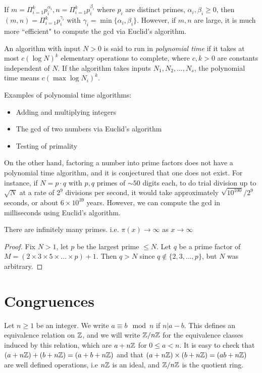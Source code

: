 \documentclass[10pt,a4paper]{article}
\begin{document}
If $m = \Pi_{i=1}^k p_i^{\alpha_i}, n = \Pi_{i=1}^k p_i^{\beta_i}$ where $p_i$ are distinct primes, $\alpha_i, \beta_i \geq 0$, then $(m,n) = \Pi_{i=1}^k p_i^{\gamma_i}$ with $\gamma_i = \min\{\alpha_i, \beta_i\}$. However, if $m,n$ are large, it is much more ``efficient" to compute the gcd via Euclid's algorithm.

An algorithm with input $N>0$ is said to run in \emph{polynomial time} if it takes at most $c(\log N)^k$ elementary operations to complete, where $c,k > 0$ are constants independent of $N$. If the algorithm takes inputs $N_1, N_2, \ldots, N_s$, the polynomial time means $c(\max\log N_i)^k$.

Examples of polynomial time algorithms:
\begin{itemize}
\item Adding and multiplying integers
\item The gcd of two numbers via Euclid's algorithm
\item Testing of primality
\end{itemize}
On the other hand, factoring a number into prime factors does not have a polynomial time algorithm, and it is conjectured that one does not exist. For instance, if $N=p\cdot q$ with $p,q$ primes of $\sim 50$ digits each, to do trial division up to $\sqrt{N}$ at a rate of $2^9$ divisions per second, it would take approximately $\sqrt{10^{100}}/2^9$ seconds, or about $6\times 10^39$ years. However, we can compute the gcd in milliseconds using Euclid's algorithm.

\begin{theorem}
There are infinitely many primes. i.e. $\pi(x) \rightarrow \infty$ as $x\rightarrow \infty$
\end{theorem}
\begin{proof}
Fix $N>1$, let $p$ be the largest prime $\leq N$. Let $q$ be a prime factor of $M = (2\times 3\times 5 \times\ldots \times p) +1$. Then $q > N$ since $q \notin \{2,3,\ldots, p\}$, but $N$ was arbitrary.
\end{proof}

\section{Congruences}
Let $n\geq 1$ be an integer. We write $a\equiv b \mod n$ if $n|a-b$. This defines an equivalence relation on $\mathbb{Z}$, and we will write $\mathbb{Z}/n\mathbb{Z}$ for the equivalence classes induced by this relation, which are $a + n\mathbb{Z}$ for $0\leq a < n$. It is easy to check that $(a+n\mathbb{Z}) + (b+n\mathbb{Z}) = (a+b+n\mathbb{Z})$ and that $(a+n\mathbb{Z})\times (b+n\mathbb{Z}) = (ab+n\mathbb{Z})$ are well defined operations, i.e $n\mathbb{Z}$ is an ideal, and $\mathbb{Z}/n\mathbb{Z}$ is the quotient ring. 
\end{document}
